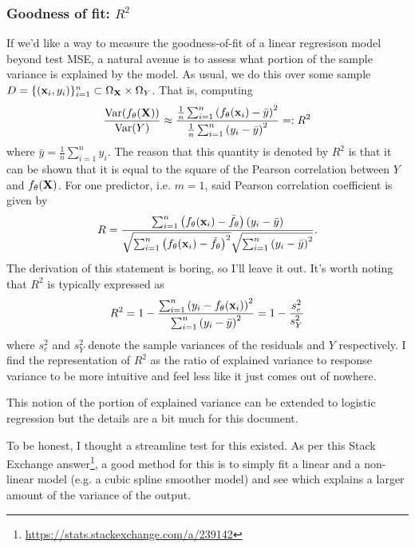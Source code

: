 \documentclass[11pt]{article}
\begin{document}
\subsubsection{Goodness of fit: $R^2$}
If we'd like a way to measure the goodness-of-fit of a linear regresison model beyond test MSE, a natural avenue is to assess what portion of the sample variance is explained by the model. As usual, we do this over some sample $D=\{(\mathbf{x}_i,y_i)\}_{i=1}^n\subset\Omega_{\mathbf{X}}\times\Omega_{Y}$. That is, computing
$$
\frac{\text{Var}(f_{\theta}(\mathbf{X}))}{\text{Var}(Y)}
\approx
\frac{\frac{1}{n}\sum_{i=1}^n\left(f_{\theta}(\mathbf{x}_i)-\bar{y}\right)^2}{\frac{1}{n}\sum_{i=1}^n\left(y_i-\bar{y}\right)^2}
=:
R^2
$$
where $\bar{y}=\frac{1}{n}\sum_{i=1}^ny_i$. The reason that this quantity is denoted by $R^2$ is that it can be shown that it is equal to the square of the Pearson correlation between $Y$ and $f_{\theta}(\mathbf{X})$. For one predictor, i.e. $m=1$, said Pearson correlation coefficient is given by
$$
R
=
\frac{\sum_{i=1}^n\left(f_{\theta}(\mathbf{x}_i)-\bar{f}_{\theta}\right)(y_i-\bar{y})}{\sqrt{\sum_{i=1}^n\left(f_{\theta}(\mathbf{x}_i)-\bar{f}_{\theta}\right)^2}\sqrt{\sum_{i=1}^n\left(y_i-\bar{y}\right)^2}}.
$$
The derivation of this statement is boring, so I'll leave it out. It's worth noting that $R^2$ is typically expressed as
$$
R^2
=
1-\frac{\sum_{i=1}^n\left(y_i-f_{\theta}(\mathbf{x}_i)\right)^2}{\sum_{i=1}^n\left(y_i-\bar{y}\right)^2}
=
1-\frac{s_e^2}{s_Y^2}
$$
where $s_e^2$ and $s_Y^2$ denote the sample variances of the residuals and $Y$ respectively. I find the representation of $R^2$ as the ratio of explained variance to response variance to be more intuitive and feel less like it just comes out of nowhere.

This notion of the portion of explained variance can be extended to logistic regression but the details are a bit much for this document.

\begin{tcolorbox}[title={\centering\textbf{How can we get an idea of the extent to which our features and output are linearly related without plotting?}}, colback=myLightBlue, colbacktitle=myDarkBlue, colframe=myDarkBlue, coltitle=white]
    To be honest, I thought a streamline test for this existed. As per this Stack Exchange answer\footnote{\url{https://stats.stackexchange.com/a/239142}}, a good method for this is to simply fit a linear and a non-linear model (e.g. a cubic spline smoother model) and see which explains a larger amount of the variance of the output.
\end{tcolorbox}
\end{document}
